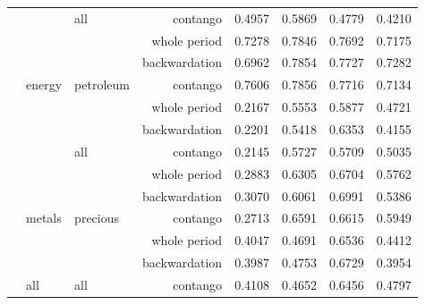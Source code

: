 \documentclass[]{elsarticle} %
\begin{document}
\begin{longtable}[t]{>{}lllrrrrr}
\nopagebreak
 &  & \multirow[t]{-3}{*}{\raggedright\arraybackslash all} & contango & 0.4957 & 0.5869 & 0.4779 & 0.4210\\
\nopagebreak
 &  &  & whole period & 0.7278 & 0.7846 & 0.7692 & 0.7175\\
\nopagebreak
 &  &  & backwardation & 0.6962 & 0.7854 & 0.7727 & 0.7282\\
\nopagebreak
 & \multirow[t]{-6}{*}{\raggedright\arraybackslash energy} & \multirow[t]{-3}{*}{\raggedright\arraybackslash petroleum} & contango & 0.7606 & 0.7856 & 0.7716 & 0.7134\\
\nopagebreak
 &  &  & whole period & 0.2167 & 0.5553 & 0.5877 & 0.4721\\
\nopagebreak
 &  &  & backwardation & 0.2201 & 0.5418 & 0.6353 & 0.4155\\
\nopagebreak
 &  & \multirow[t]{-3}{*}{\raggedright\arraybackslash all} & contango & 0.2145 & 0.5727 & 0.5709 & 0.5035\\
\nopagebreak
 &  &  & whole period & 0.2883 & 0.6305 & 0.6704 & 0.5762\\
\nopagebreak
 &  &  & backwardation & 0.3070 & 0.6061 & 0.6991 & 0.5386\\
\nopagebreak
\multirow[t]{-27}{*}{\raggedright\arraybackslash \textbf{US}} & \multirow[t]{-6}{*}{\raggedright\arraybackslash metals} & \multirow[t]{-3}{*}{\raggedright\arraybackslash precious} & contango & 0.2713 & 0.6591 & 0.6615 & 0.5949\\
\cmidrule{1-8}\pagebreak[0]
 &  &  & whole period & 0.4047 & 0.4691 & 0.6536 & 0.4412\\
\nopagebreak
 &  &  & backwardation & 0.3987 & 0.4753 & 0.6729 & 0.3954\\
\nopagebreak
\multirow[t]{-3}{*}{\raggedright\arraybackslash \textbf{GB}} & \multirow[t]{-3}{*}{\raggedright\arraybackslash all} & \multirow[t]{-3}{*}{\raggedright\arraybackslash all} & contango & 0.4108 & 0.4652 & 0.6456 & 0.4797\\*
\end{longtable}
\endgroup{}

\newpage
\end{document}
